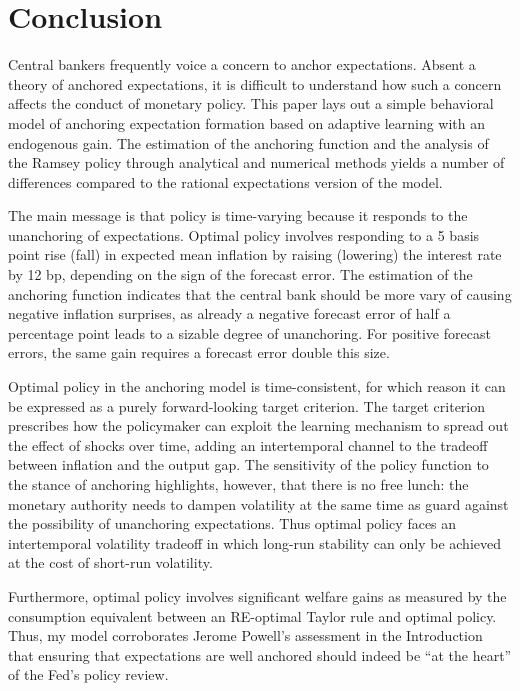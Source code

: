 \documentclass[11pt]{article}
\renewcommand{\[}{\begin{equation}}
\renewcommand{\]}{\end{equation}}
\def\movepibar{5 }
\def\movei{12 }
\begin{document}
\section{Conclusion}\label{conclusion}
Central bankers frequently voice a concern to anchor expectations. Absent a theory of anchored expectations, it is difficult to understand how such a concern affects the conduct of monetary policy. This paper lays out a simple behavioral model of anchoring expectation formation based on adaptive learning with an endogenous gain. The estimation of the anchoring function and the analysis of the Ramsey policy through analytical and numerical methods yields a number of differences compared to the rational expectations version of the model. 

The main message is that policy is time-varying because it responds to the unanchoring of expectations. Optimal policy involves responding to a \movepibar basis point rise (fall) in expected mean inflation by raising (lowering) the interest rate by \movei bp, depending on the sign of the forecast error. The estimation of the anchoring function indicates that the central bank should be more vary of causing negative inflation surprises, as already a negative forecast error of half a percentage point leads to a sizable degree of unanchoring. For positive forecast errors, the same gain requires a forecast error double this size. 

Optimal policy in the anchoring model is time-consistent, for which reason it can be expressed as a purely forward-looking target criterion. The target criterion prescribes how the policymaker can exploit the learning mechanism to spread out the effect of shocks over time, adding an intertemporal channel to the tradeoff between inflation and the output gap. The sensitivity of the policy function to the stance of anchoring highlights, however, that there is no free lunch: the monetary authority needs to dampen volatility at the same time as guard against the possibility of unanchoring expectations. Thus optimal policy faces an intertemporal volatility tradeoff in which long-run stability can only be achieved at the cost of short-run volatility.

Furthermore, 
optimal policy involves significant welfare gains as measured by the consumption equivalent between an RE-optimal Taylor rule and optimal policy.
Thus, my model corroborates Jerome Powell's assessment in the Introduction that ensuring that expectations are well anchored should indeed be ``at the heart'' of the Fed's policy review.
\end{document}
